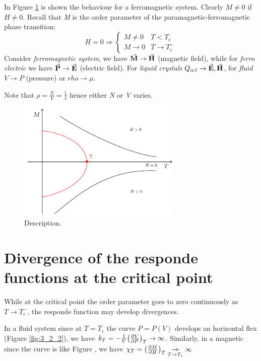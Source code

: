 \documentclass[../main/main.tex]{subfiles}
\begin{document}
In Figure \ref{fig:3_3} is shown the behaviour for a ferromagnetic system. Clearly \( M \neq 0 \) if \( H \neq 0 \). Recall that \emph{M} is the order parameter of the paramagnetic-ferromagnetic phase transition:
\begin{equation}
  H= 0 \Rightarrow \begin{cases}
    M \neq 0 & T < T_c   \\
    M \rightarrow 0 & T \rightarrow T_c^-
\end{cases}
  \label{eq:}
\end{equation}
 Consider \emph{ferromagnetic system}, we have \( \va{M} \rightarrow \va{H}   \) (magnetic field), while for \emph{ferro electric} we have \( \va{P} \rightarrow \va{E}   \) (electric field). For \emph{liquid crystals} \( Q_{\alpha \beta } \rightarrow \va{E},\va{H}   \), for \emph{fluid} \( V \rightarrow P \) (pressure) or \( rho \rightarrow \mu  \).
 \begin{remark}
 Note that \( \rho = \frac{N}{V} = \frac{1}{v} \) hence either \emph{N} or \emph{V} varies.
 \end{remark}



\begin{figure}[h!]
\centering
\includegraphics[width=0.7\textwidth]{../lessons/3_image/5.pdf}
\caption{\label{fig:3_3} Description.}
\end{figure}

\section{Divergence of the responde functions at the critical point}
While at the critical point the order parameter goes to zero continuously as \( T \rightarrow T_c^- \), the responde function may develop divergences.
\begin{example}
In a fluid system since at \( T=T_c \) the curve \( P = P(V) \) develops an horizontal flex (Figure \ref{fig:3_2_2}), we have \( k_T = -\frac{1}{V} \qty(\pdv{V}{P} )_T  \rightarrow \infty  \). Similarly, in a magnetic since the curve is like Figure , we have \( \chi _T = \qty(\pdv{M}{H} )_T \underset{T \rightarrow  T_c}{\rightarrow } \infty   \)


\end{example}
\end{document}
